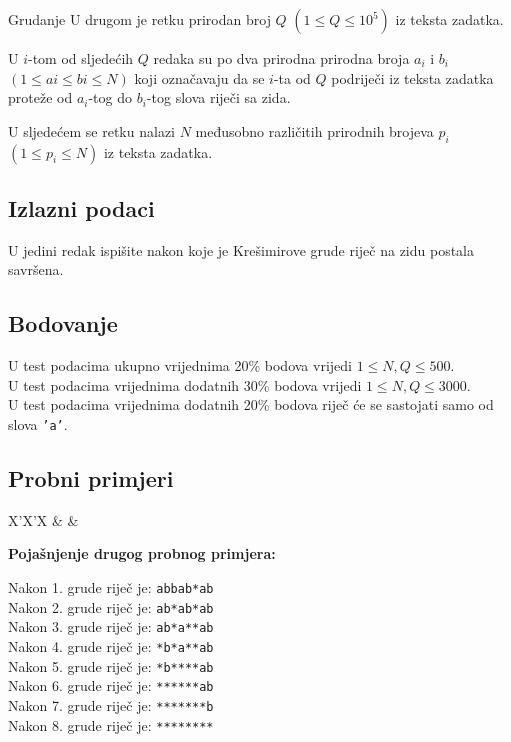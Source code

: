 \begin{statement}[
  problempoints=70,
  timelimit=1 sekunda,
  memorylimit=512 MiB,
]{Grudanje}
U drugom je retku prirodan broj $Q$ $(1 \le Q \le 10^5)$ iz teksta zadatka.

U $i$-tom od sljedećih $Q$ redaka su po dva prirodna prirodna broja $a_i$ i
$b_i$ $(1 \le ai \le bi \le N)$ koji označavaju da se $i$-ta od $Q$ podriječi iz
teksta zadatka proteže od $a_i$-tog do $b_i$-tog slova riječi sa zida.

U sljedećem se retku nalazi $N$ međusobno različitih prirodnih brojeva $p_i$
$(1 \le p_i \le N)$ iz teksta zadatka.

\subsection*{Izlazni podaci}
U jedini redak ispišite nakon koje je Krešimirove grude riječ na zidu postala
savršena.

 \subsection*{Bodovanje}
U test podacima ukupno vrijednima 20\% bodova vrijedi $1 \le N, Q \le 500$. \\
U test podacima vrijednima dodatnih 30\% bodova vrijedi $1 \le N, Q \le 3000$. \\
U test podacima vrijednima dodatnih 20\% bodova riječ će se sastojati samo od
slova \texttt{'a'}.


\subsection*{Probni primjeri}
\begin{tabularx}{\textwidth}{X'X'X}
 &
 &
\end{tabularx}

\textbf{Pojašnjenje drugog probnog primjera:}

Nakon 1. grude riječ je: \texttt{abbab*ab} \\
Nakon 2. grude riječ je: \texttt{ab*ab*ab} \\
Nakon 3. grude riječ je: \texttt{ab*a**ab} \\
Nakon 4. grude riječ je: \texttt{*b*a**ab} \\
Nakon 5. grude riječ je: \texttt{*b****ab} \\
Nakon 6. grude riječ je: \texttt{******ab} \\
Nakon 7. grude riječ je: \texttt{*******b} \\
Nakon 8. grude riječ je: \texttt{********}

\end{statement}

